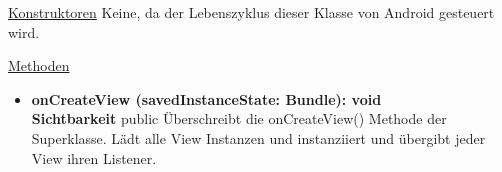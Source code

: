 \underline{Konstruktoren}\newline
\indent Keine, da der Lebenszyklus dieser Klasse von Android gesteuert wird.\newline

\underline{Methoden}
\begin{itemize}
\itemsep0pt
\item \textbf{onCreateView (savedInstanceState: Bundle): void}\hfill\\
\textbf{Sichtbarkeit} public\newline
Überschreibt die onCreateView() Methode der Superklasse. Lädt alle View Instanzen und instanziiert und übergibt jeder View ihren Listener.

\end{itemize}